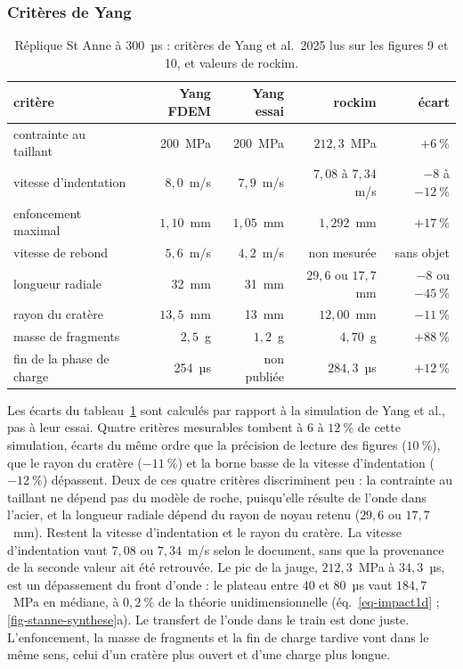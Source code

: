 \subsubsection{Critères de Yang}

\begin{table}[htbp]
\centering
\caption{Réplique St Anne à 300~µs : critères de Yang et al.~2025 lus sur les figures 9 et 10, et valeurs de rockim.}
\label{tab-stanne}
\small
\begin{tabular}{@{}lrrrr@{}}
\toprule
critère & Yang FDEM & Yang essai & rockim & écart \\
\midrule
contrainte au taillant & 200~MPa & 200~MPa & $212{,}3$~MPa & $+6~\%$ \\
vitesse d'indentation & $8{,}0$~m/s & $7{,}9$~m/s & $7{,}08$ à $7{,}34$~m/s & $-8$ à $-12~\%$ \\
enfoncement maximal & $1{,}10$~mm & $1{,}05$~mm & $1{,}292$~mm & $+17~\%$ \\
vitesse de rebond & $5{,}6$~m/s & $4{,}2$~m/s & non mesurée & sans objet \\
longueur radiale & 32~mm & 31~mm & $29{,}6$ ou $17{,}7$~mm & $-8$ ou $-45~\%$ \\
rayon du cratère & $13{,}5$~mm & 13~mm & $12{,}00$~mm & $-11~\%$ \\
masse de fragments & $2{,}5$~g & $1{,}2$~g & $4{,}70$~g & $+88~\%$ \\
fin de la phase de charge & 254~µs & non publiée & $284{,}3$~µs & $+12~\%$ \\
\bottomrule
\end{tabular}
\end{table}

Les écarts du tableau~\ref{tab-stanne} sont calculés par rapport à la simulation de Yang et al., pas à leur essai. Quatre critères mesurables tombent à 6 à $12~\%$ de cette simulation, écarts du même ordre que la précision de lecture des figures ($10~\%$), que le rayon du cratère ($-11~\%$) et la borne basse de la vitesse d'indentation ($-12~\%$) dépassent. Deux de ces quatre critères discriminent peu : la contrainte au taillant ne dépend pas du modèle de roche, puisqu'elle résulte de l'onde dans l'acier, et la longueur radiale dépend du rayon de noyau retenu ($29{,}6$ ou $17{,}7$~mm). Restent la vitesse d'indentation et le rayon du cratère. La vitesse d'indentation vaut $7{,}08$ ou $7{,}34$~m/s selon le document, sans que la provenance de la seconde valeur ait été retrouvée. Le pic de la jauge, $212{,}3$~MPa à $34{,}3$~µs, est un dépassement du front d'onde : le plateau entre 40 et 80~µs vaut $184{,}7$~MPa en médiane, à $0{,}2~\%$ de la théorie unidimensionnelle (éq.~\ref{eq-impact1d} ; \cref{fig-stanne-synthese}a). Le transfert de l'onde dans le train est donc juste. L'enfoncement, la masse de fragments et la fin de charge tardive vont dans le même sens, celui d'un cratère plus ouvert et d'une charge plus longue.

